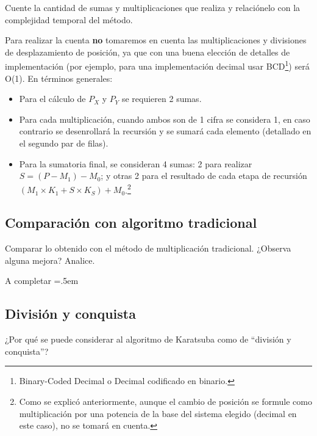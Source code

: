 \documentclass[titlepage,a4paper]{article}
\newenvironment{lcverbatim}
 {\SaveVerbatim{cverb}}
 {\endSaveVerbatim
  \flushleft\fboxrule=0pt\fboxsep=.5em
  \colorbox{cverbbg}{%
    \makebox[\dimexpr\linewidth-2\fboxsep][l]{\BUseVerbatim{cverb}}%
  }
  \endflushleft
}
\begin{document}
\begin{tcolorbox}[colback=blue!5!white,colframe=blue!75!black,title=Enunciado 1.2]
    Cuente la cantidad de sumas y multiplicaciones que realiza y relaciónelo con la complejidad temporal del método.
\end{tcolorbox}

Para realizar la cuenta \textbf{no} tomaremos en cuenta las multiplicaciones y divisiones de desplazamiento de posición, ya que con una buena elección de detalles de implementación (por ejemplo, para una implementación decimal usar BCD\footnote{Binary-Coded Decimal o Decimal codificado en binario.}) será O(1). En términos generales:
\begin{itemize}
    \item Para el cálculo de $P_X$ y $P_Y$ se requieren 2 sumas.
    \item Para cada multiplicación, cuando ambos son de 1 cifra se considera 1, en caso contrario se desenrollará la recursión y se sumará cada elemento (detallado en el segundo par de filas).
    \item Para la sumatoria final, se consideran 4 sumas: 2 para realizar $S = (P-M_1)-M_0$; y otras 2 para el resultado de cada etapa de recursión $(M_1\times K_1 + S\times K_S) + M_0$.\footnote{Como se explicó anteriormente, aunque el cambio de posición se formule como multiplicación por una potencia de la base del sistema elegido (decimal en este caso), no se tomará en cuenta.}
\end{itemize}


\subsection{Comparación con algoritmo tradicional}
\begin{tcolorbox}[colback=blue!5!white,colframe=blue!75!black,title=Enunciado 1.3]
    Comparar lo obtenido con el método de multiplicación tradicional. ¿Observa alguna mejora? Analice.
\end{tcolorbox}

\begin{lcverbatim}
    A completar
\end{lcverbatim}


\subsection{División y conquista}

\begin{tcolorbox}[colback=blue!5!white,colframe=blue!75!black,title=Enunciado 1.4]
    ¿Por qué se puede considerar al algoritmo de Karatsuba como de “división y conquista”?
\end{tcolorbox}
\end{document}
